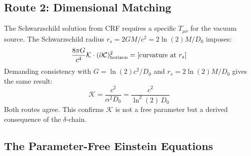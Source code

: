 \documentclass[12pt, a4paper]{article}
\begin{document}
\subsection{Route 2: Dimensional Matching}

\begin{derivedbox}[title={$\mathcal{K}$ from Dimensional Matching (Independent Route)}]
The Schwarzschild solution from CRF requires a specific $T_{\mu\nu}$ for the vacuum
source. The Schwarzschild radius $r_s = 2GM/c^2 = 2\ln(2)M/D_0$ imposes:
\[
  \frac{8\pi G}{c^4}\mathcal{K}\cdot(\partial\mathcal{C})^2_{\rm horizon} = \text{[curvature at }r_s]
\]
Demanding consistency with $G = \ln(2)c^2/D_0$ and $r_s = 2\ln(2)M/D_0$ gives the
same result:
\[
  \mathcal{K} = \frac{c^2}{\alpha^2 D_0} = \frac{c^2}{\ln^2(2)\,D_0}
\]
Both routes agree. This confirms $\mathcal{K}$ is not a free parameter but a derived
consequence of the $\delta$-chain.
\end{derivedbox}

\subsection{The Parameter-Free Einstein Equations}
\end{document}
